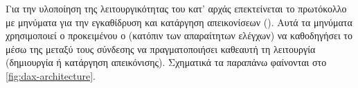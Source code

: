 
Για την υλοποίηση της λειτουργικότητας του  κατ' αρχάς
επεκτείνεται το  πρωτόκολλο με μηνύματα για την εγκαθίδρυση και
κατάργηση απεικονίσεων (). Αυτά τα μηνύματα χρησιμοποιεί ο \guest{}
προκειμένου ο  (κατόπιν των απαραίτητων ελέγχων) να καθοδηγήσει το
\qemu{} μέσω της μεταξύ τους σύνδεσης να πραγματοποιήσει καθεαυτή τη λειτουργία
(δημιουργία ή κατάργηση απεικόνισης). Σχηματικά τα παραπάνω φαίνονται
στο \ref{fig:dax-architecture}.
